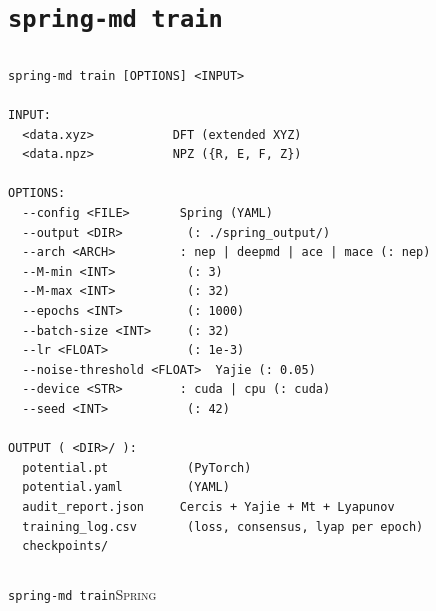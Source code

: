 \documentclass[12pt,a4paper]{article}
\theoremstyle{remark}
\newcommand{\Spring}{\textsc{Spring}}
\begin{document}
\section{\texttt{spring-md train}}

\subsection{}

\begin{lstlisting}[caption={\texttt{spring-md train} },label=lst:train]
spring-md train [OPTIONS] <INPUT>

INPUT:
  <data.xyz>           DFT (extended XYZ)
  <data.npz>           NPZ ({R, E, F, Z})

OPTIONS:
  --config <FILE>       Spring (YAML)
  --output <DIR>         (: ./spring_output/)
  --arch <ARCH>         : nep | deepmd | ace | mace (: nep)
  --M-min <INT>          (: 3)
  --M-max <INT>          (: 32)
  --epochs <INT>         (: 1000)
  --batch-size <INT>     (: 32)
  --lr <FLOAT>           (: 1e-3)
  --noise-threshold <FLOAT>  Yajie (: 0.05)
  --device <STR>        : cuda | cpu (: cuda)
  --seed <INT>           (: 42)

OUTPUT ( <DIR>/ ):
  potential.pt           (PyTorch)
  potential.yaml         (YAML)
  audit_report.json     Cercis + Yajie + Mt + Lyapunov
  training_log.csv       (loss, consensus, lyap per epoch)
  checkpoints/          
\end{lstlisting}

\subsection{}

\texttt{spring-md train}\Spring{}
\end{document}
